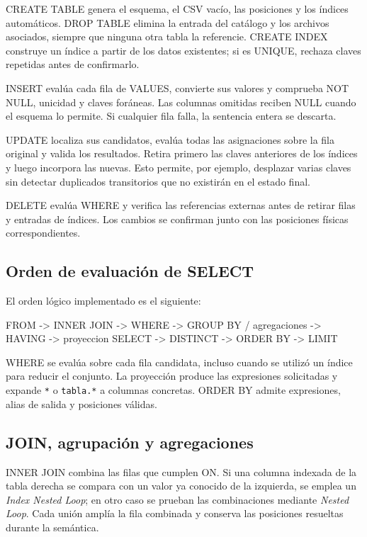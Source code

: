 \documentclass[11pt,a4paper]{article}
\begin{document}
CREATE TABLE genera el esquema, el CSV vacío, las posiciones y los índices
automáticos. DROP TABLE elimina la entrada del catálogo y los archivos
asociados, siempre que ninguna otra tabla la referencie. CREATE INDEX
construye un índice a partir de los datos existentes; si es UNIQUE,
rechaza claves repetidas antes de confirmarlo.

INSERT evalúa cada fila de VALUES, convierte sus valores y comprueba
NOT NULL, unicidad y claves foráneas. Las columnas omitidas reciben NULL
cuando el esquema lo permite. Si cualquier fila falla, la sentencia
entera se descarta.

UPDATE localiza sus candidatos, evalúa todas las asignaciones sobre la
fila original y valida los resultados. Retira primero las claves
anteriores de los índices y luego incorpora las nuevas. Esto permite,
por ejemplo, desplazar varias claves sin detectar duplicados transitorios
que no existirán en el estado final.

DELETE evalúa WHERE y verifica las referencias externas antes de retirar
filas y entradas de índices. Los cambios se confirman junto con las
posiciones físicas correspondientes.

\subsection{Orden de evaluación de SELECT}

El orden lógico implementado es el siguiente:

\begin{archivo}
FROM -> INNER JOIN -> WHERE
     -> GROUP BY / agregaciones -> HAVING
     -> proyeccion SELECT -> DISTINCT -> ORDER BY -> LIMIT
\end{archivo}

WHERE se evalúa sobre cada fila candidata, incluso cuando se utilizó un
índice para reducir el conjunto. La proyección produce las expresiones
solicitadas y expande \texttt{*} o \texttt{tabla.*} a columnas concretas.
ORDER BY admite expresiones, alias de salida y posiciones válidas.

\subsection{JOIN, agrupación y agregaciones}

INNER JOIN combina las filas que cumplen ON. Si una columna indexada de
la tabla derecha se compara con un valor ya conocido de la izquierda,
se emplea un \emph{Index Nested Loop}; en otro caso se prueban las
combinaciones mediante \emph{Nested Loop}. Cada unión amplía la fila
combinada y conserva las posiciones resueltas durante la semántica.
\end{document}

